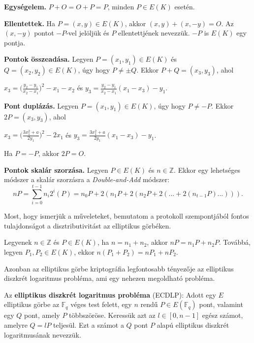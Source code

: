 \begin{outdentlist}
    \item[]
    \textbf{Egységelem.} $P + O = O + P = P$, minden $P \in E(K)$ esetén.

    \item[]
    \textbf{Ellentettek.} Ha $P = (x, y) \in E(K)$, akkor $(x, y) + (x, -y) = O$. Az $(x, -y)$ pontot $-P$-vel jelöljük és $P$ ellentettjének nevezzük. $-P$ is $E(K)$ egy pontja.

    \item[]
    \textbf{Pontok összeadása.} Legyen $P = (x_1, y_1) \in E(K)$ és $Q = (x_2, y_2) \in E(K)$, úgy hogy $P \neq \pm Q$. Ekkor $P + Q = (x_3, y_3)$, ahol 
    \begin{center}$x_3 = \big(\frac{y_2 - y_1}{x_2 - x_1}\big)^2 - x_1 - x_2$ és $y_3 = \frac{y_2 - y_1}{x_2 - x_1}(x_1 - x_3) - y_1$.\end{center}

    \item[]
    \textbf{Pont duplázás.} Legyen $P = (x_1, y_1) \in E(K)$, úgy hogy $P \neq -P$. Ekkor $2P = (x_3, y_3)$, ahol
    \begin{center}$x_3 = \big(\frac{3x_1^2 + a}{2y_1}\big)^2 - 2x_1$ és $y_3 = \frac{3x_1^2 + a}{2y_1}(x_1 - x_3) - y_1$.\end{center} Ha $P = -P$, akkor $2P = O$.

    \item[]
    \textbf{Pontok skalár szorzása.} Legyen $P \in E(K)$ és $n \in \mathbb{Z}$. Ekkor egy lehetséges módszer a skalár szorzásra a \textit{Double-and-Add} módszer: $$nP = \sum_{i = 0}^{t-1} n_i 2^i(P) = n_0P + 2(n_1P + 2(n_2P + 2(... + 2(n_{t-1}P)...))).$$
\end{outdentlist}

Most, hogy ismerjük a műveleteket, bemutatom a protokoll szempontjából fontos tulajdonságot a disztributivitást az elliptikus görbéken.

Legyenek $n \in \mathbb{Z}$ és $P \in E(K)$, ha $n = n_1 + n_2$, akkor $nP = n_1P + n_2P$. Továbbá, legyen $P_1, P_2 \in E(K)$, ekkor $n(P_1 + P_2) = nP_1 + nP_2$.

Azonban az elliptikus görbe kriptográfia legfontosabb tényezője az elliptikus diszkrét logaritmus probléma, ami egy nehezen megoldható probléma.

\begin{definition*}
    Az \textbf{elliptikus diszkrét logaritmus probléma} (ECDLP): Adott egy $E$ elliptikus görbe az $\mathbb{F}_q$ véges test felett, egy $n$ rendű $P \in E(\mathbb{F}_q)$ pont, valamint egy $Q$ pont, amely $P$ többszöröse. Keressük azt az $l \in [0, n - 1]$ egész számot, amelyre $Q = lP$ teljesül. Ezt a számot a $Q$ pont $P$ alapú elliptikus diszkrét logaritmusának nevezzük.
\end{definition*}

